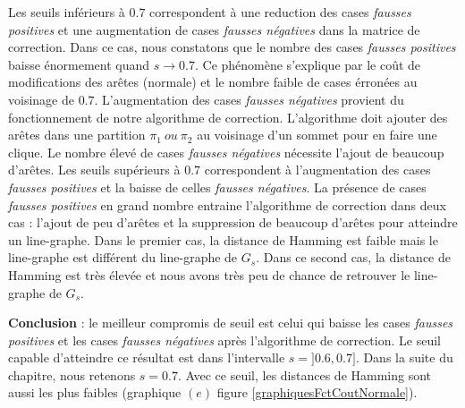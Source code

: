 Les seuils inf\'erieurs \`a $0.7$ correspondent \`a une reduction des cases {\em fausses positives} et une augmentation de cases {\em fausses n\'egatives} dans la matrice de correction. Dans ce cas, nous constatons que le nombre des  cases
{\em fausses positives} baisse \'enormement quand $s \rightarrow 0.7$. Ce ph\'enom\`ene s'explique par le co\^ut de modifications des ar\^etes (normale) et le nombre faible de cases \'erron\'ees au voisinage de  $0.7$. L'augmentation des cases  {\em fausses n\'egatives} provient du  fonctionnement de notre algorithme de correction.  L'algorithme doit ajouter des ar\^etes dans une partition $\pi_1 ~ou~ \pi_2$ au voisinage d'un sommet pour en faire une clique. Le nombre \'elev\'e de cases  {\em fausses n\'egatives} n\'ecessite l'ajout de beaucoup d'ar\^etes.
\newline
Les seuils sup\'erieurs \`a $0.7$ correspondent \`a l'augmentation des  cases {\em fausses positives} et la baisse de celles {\em fausses n\'egatives}. 
La pr\'esence de cases {\em fausses positives} en grand nombre entraine l'algorithme de correction dans deux cas :
l'ajout de peu d'ar\^etes  et 
la suppression de beaucoup d'ar\^etes pour atteindre un line-graphe.
Dans le premier cas, la distance de Hamming est faible mais le line-graphe est diff\'erent du line-graphe de $G_s$. 
Dans ce second cas, la distance de Hamming est tr\`es \'elev\'ee et nous avons tr\`es peu de chance de retrouver le line-graphe de $G_s$.
\newline

{\bf Conclusion} : 
le meilleur compromis de seuil est celui qui baisse les cases {\em fausses positives}  et les cases {\em fausses n\'egatives} apr\`es l'algorithme de correction.  Le seuil capable d'atteindre ce r\'esultat est dans l'intervalle $s=]0.6,0.7]$. Dans la suite du chapitre, nous retenons $s=0.7$.
Avec ce seuil, les distances de Hamming sont aussi les plus faibles (graphique $(e)$ figure \ref{graphiquesFctCoutNormale}). 